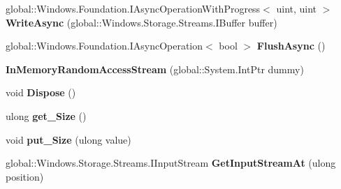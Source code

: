 \begin{DoxyCompactItemize}
\item 
\mbox{\label{class_windows_1_1_storage_1_1_streams_1_1_in_memory_random_access_stream_a812f40b23e43e9921ef7cc08a4bb0a58}} 
global\+::\+Windows.\+Foundation.\+I\+Async\+Operation\+With\+Progress$<$ uint, uint $>$ {\bfseries Write\+Async} (global\+::\+Windows.\+Storage.\+Streams.\+I\+Buffer buffer)
\item 
\mbox{\label{class_windows_1_1_storage_1_1_streams_1_1_in_memory_random_access_stream_a43197e973b559a363116945f30e5a6da}} 
global\+::\+Windows.\+Foundation.\+I\+Async\+Operation$<$ bool $>$ {\bfseries Flush\+Async} ()
\item 
\mbox{\label{class_windows_1_1_storage_1_1_streams_1_1_in_memory_random_access_stream_a58fe83e628070875813e711cb730b9e1}} 
{\bfseries In\+Memory\+Random\+Access\+Stream} (global\+::\+System.\+Int\+Ptr dummy)
\item 
\mbox{\label{class_windows_1_1_storage_1_1_streams_1_1_in_memory_random_access_stream_a46eac03da7bc9cadfb0e54b02113e49d}} 
void {\bfseries Dispose} ()
\item 
\mbox{\label{class_windows_1_1_storage_1_1_streams_1_1_in_memory_random_access_stream_aa647257f534704ae03fa50c86a98f839}} 
ulong {\bfseries get\+\_\+\+Size} ()
\item 
\mbox{\label{class_windows_1_1_storage_1_1_streams_1_1_in_memory_random_access_stream_ac8b380272b33f6167715e900ce8b155f}} 
void {\bfseries put\+\_\+\+Size} (ulong value)
\item 
\mbox{\label{class_windows_1_1_storage_1_1_streams_1_1_in_memory_random_access_stream_a4eb2c7faf4803409163b311c912a083b}} 
global\+::\+Windows.\+Storage.\+Streams.\+I\+Input\+Stream {\bfseries Get\+Input\+Stream\+At} (ulong position)

\end{DoxyCompactItemize}

